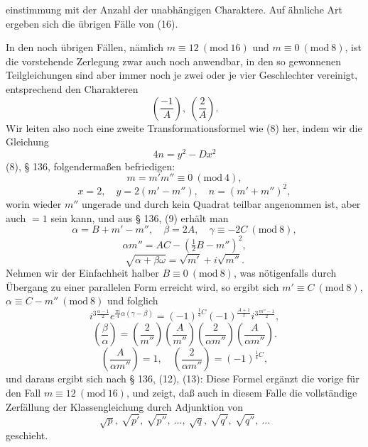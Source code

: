 einstimmung mit der Anzahl der unabhängigen Charaktere. Auf ähnliche Art ergeben sich die übrigen Fälle von (16).

In den noch übrigen Fällen, nämlich $m \equiv 12\ (\mathrm{mod}\ 16)$ und $m \equiv 0\ (\mathrm{mod}\ 8)$, ist die vorstehende Zerlegung zwar auch noch anwendbar, in den so gewonnenen Teilgleichungen sind aber immer noch je zwei oder je vier Geschlechter vereinigt, entsprechend den Charakteren
\[
\left(\frac{-1}{A}\right), \ \left(\frac{2}{A}\right).
\]
Wir leiten also noch eine zweite Transformationsformel wie (8) her, indem wir die Gleichung
\[
4n = y^2 - Dx^2
\]
(8), § 136, folgendermaßen befriedigen:
\[
m = m'm'' \equiv 0\ (\mathrm{mod}\ 4),
\]
\[
x = 2, \quad y = 2(m' - m''), \quad n = (m'+m'')^2,
\]
worin wieder $m''$ ungerade und durch kein Quadrat teilbar angenommen ist, aber auch $= 1$ sein kann, und aus § 136, (9) erhält man
\[
\alpha = B + m' - m'', \quad \beta = 2A, \quad \gamma \equiv -2C\ (\mathrm{mod}\ 8),
\]
\[
\alpha m'' = AC - \left(\tfrac12 B - m''\right)^2,
\]
\[
\sqrt{\alpha + \beta\omega} = \sqrt{m'} + i\sqrt{m''}.
\]
Nehmen wir der Einfachheit halber $B \equiv 0\ (\mathrm{mod}\ 8)$, was nötigenfalls durch Übergang zu einer parallelen Form erreicht wird, so ergibt sich $m' \equiv C\ (\mathrm{mod}\ 8)$, $\alpha \equiv C - m''\ (\mathrm{mod}\ 8)$ und folglich
\[
i^{3\frac{\alpha-1}{2}} e^{\frac{\pi i}{4}\alpha(\gamma-\beta)} = (-1)^{\frac14 C} (-1)^{\frac{A+1}{2}} i^{3\frac{m''-1}{2}},
\]
\[
\left(\frac{\beta}{\alpha}\right) = \left(\frac{2}{m''}\right)\left(\frac{A}{m''}\right)\left(\frac{2}{\alpha m''}\right)\left(\frac{A}{\alpha m''}\right).
\]
\[
\left(\frac{A}{\alpha m''}\right) = 1, \quad \left(\frac{2}{\alpha m''}\right) = (-1)^{\frac14 C},
\]
und daraus ergibt sich nach § 136, (12), (13):
Diese Formel ergänzt die vorige für den Fall $m \equiv 12\ (\mathrm{mod}\ 16)$, und zeigt, daß auch in diesem Falle die vollständige Zerfällung der Klassengleichung durch Adjunktion von
\[
\sqrt{p}, \ \sqrt{p'}, \ \sqrt{p''}, \ \ldots, \ \sqrt{q}, \ \sqrt{q'}, \ \sqrt{q''}, \ \ldots
\]
geschieht.
